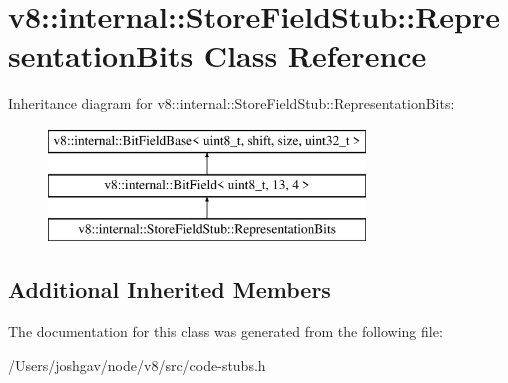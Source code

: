 \hypertarget{classv8_1_1internal_1_1_store_field_stub_1_1_representation_bits}{}\section{v8\+:\+:internal\+:\+:Store\+Field\+Stub\+:\+:Representation\+Bits Class Reference}
\label{classv8_1_1internal_1_1_store_field_stub_1_1_representation_bits}
Inheritance diagram for v8\+:\+:internal\+:\+:Store\+Field\+Stub\+:\+:Representation\+Bits\+:\begin{figure}[H]
\begin{center}
\leavevmode
\includegraphics[height=3.000000cm]{classv8_1_1internal_1_1_store_field_stub_1_1_representation_bits}
\end{center}
\end{figure}
\subsection*{Additional Inherited Members}


The documentation for this class was generated from the following file\+:\begin{DoxyCompactItemize}
\item 
/\+Users/joshgav/node/v8/src/code-\/stubs.\+h\end{DoxyCompactItemize}

